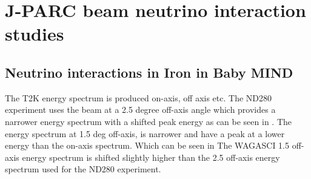 \chapter{J-PARC beam neutrino interaction studies}
\label{c:neutrinoT2K}







 
\section{Neutrino interactions in Iron in Baby MIND}

The T2K energy spectrum is produced on-axis, off axis etc. The ND280 experiment uses the beam at a 2.5 degree off-axis angle which provides a narrower energy spectrum with a shifted peak energy as can be seen in . The energy spectrum at 1.5 deg off-axis, is narrower and have a peak at a lower energy than the on-axis spectrum. Which can be seen in  The WAGASCI 1.5 off-axis energy spectrum is shifted slightly higher than the 2.5 off-axis energy spectrum used for the ND280 experiment.

